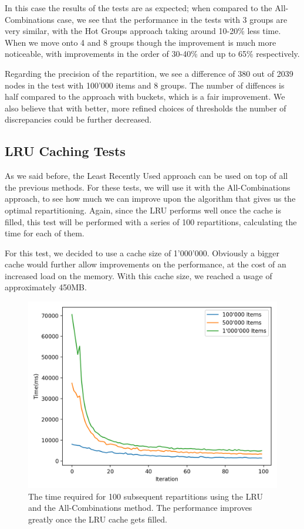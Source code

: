 In this case the results of the tests are as expected; when compared to the All-Combinations case, we see that the performance in the tests with 3 groups are very similar, with the Hot Groups approach taking around 10-20\% less time. When we move onto 4 and 8 groups though the improvement is much more noticeable, with improvements in the order of 30-40\% and up to 65\% respectively.

Regarding the precision of the repartition, we see a difference of 380 out of 2039 nodes in the test with 100'000 items and 8 groups. The number of diffences is half compared to the approach with buckets, which is a fair improvement. We also believe that with better, more refined choices of thresholds the number of discrepancies could be further decreased.

\subsection{LRU Caching Tests}\label{sec:lru-caching-tests}
As we said before, the Least Recently Used approach can be used on top of all the previous methods. For these tests, we will use it with the All-Combinations approach, to see how much we can improve upon the algorithm that gives us the optimal repartitioning. Again, since the LRU performs well once the cache is filled, this test will be performed with a series of 100 repartitions, calculating the time for each of them.

For this test, we decided to use a cache size of 1'000'000. Obviously a bigger cache would further allow improvements on the performance, at the cost of an increased load on the memory. With this cache size, we reached a usage of approximately 450MB.

\begin{figure}[!htb]
  \centering
  \includegraphics[width=\textwidth,height=\textheight,keepaspectratio]{img/LRU_8.png}
  \caption[caption]{The time required for 100 subsequent repartitions using the LRU and the All-Combinations method. The performance improves greatly once the LRU cache gets filled. }
  \label{fig:LRU_8}
\end{figure}


